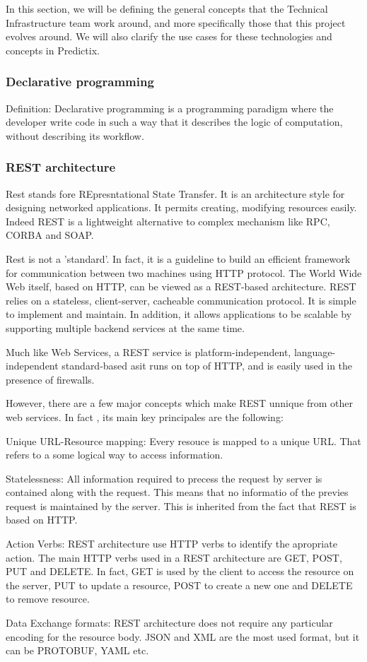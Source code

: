 In this section, we will be defining the general concepts that the Technical
Infrastructure team work around, and more specifically those that this project
evolves around. We will also clarify the use cases for these technologies and
concepts in Predictix.

\subsubsection{Declarative programming}
Definition:
Declarative programming is a programming paradigm where the developer write code
in such a way that it describes the logic of computation, without describing its
workflow.

\subsubsection{REST architecture}
Rest stands fore REpresntational State Transfer. It is an architecture style for
designing networked applications. It permits creating, modifying resources
easily. Indeed REST is a lightweight alternative to complex mechanism like RPC,
CORBA and SOAP. 

Rest is not a 'standard'. In fact,  it is a guideline to build an efficient
framework for communication between two machines using HTTP protocol. The World
Wide Web itself, based on HTTP, can be viewed as a REST-based architecture. REST
relies on a stateless, client-server, cacheable communication protocol. It is
simple to implement and maintain. In addition, it allows applications to be scalable
by supporting multiple backend services at the same time.

Much like Web Services, a REST service is platform-independent,
language-independent standard-based asit runs on top of HTTP, and is easily used
in the presence of firewalls.

However, there are a few major concepts which make REST unnique from other web
services. In fact , its main key principales are the following:

Unique URL-Resource mapping: Every resouce is mapped to a unique URL. That
refers to a some logical way  to access information. 

Statelessness: All information required to precess the request by server is
contained along with the request. This means that no informatio of the previes
request is maintained by the server. This is inherited from the fact that REST
is based on HTTP.

Action Verbs: REST architecture use HTTP verbs to identify the apropriate
action. The main HTTP verbs used in a REST architecture are GET, POST, PUT and
DELETE. In fact, GET is used by the client to access the resource on the server,
PUT to update a resource, POST to create a new one and DELETE to remove
resource.

Data Exchange formats: REST architecture does not require any particular
encoding for the resource body. JSON and XML are the most used format, but it
can be PROTOBUF, YAML etc. 
